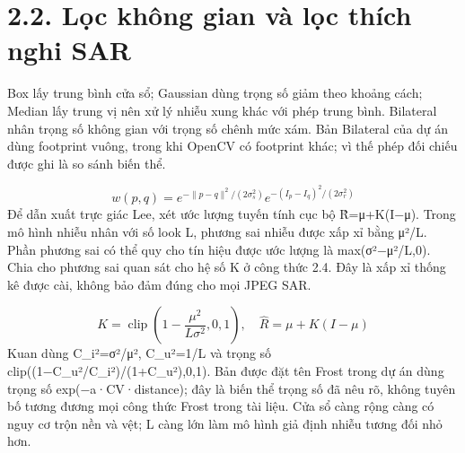 \documentclass[13pt,a4paper]{extreport}
\begin{document}
\section*{2.2. Lọc không gian và lọc thích nghi SAR}
Box lấy trung bình cửa sổ; Gaussian dùng trọng số giảm theo khoảng cách; Median lấy trung vị nên xử lý nhiễu xung khác với phép trung bình. Bilateral nhân trọng số không gian với trọng số chênh mức xám. Bản Bilateral của dự án dùng footprint vuông, trong khi OpenCV có footprint khác; vì thế phép đối chiếu được ghi là so sánh biến thể.
\par
\begin{equation}w(p,q)=e^{-\|p-q\|^2/(2\sigma_s^2)}e^{-(I_p-I_q)^2/(2\sigma_r^2)}\tag{2.3}\end{equation}
Để dẫn xuất trực giác Lee, xét ước lượng tuyến tính cục bộ R̂=μ+K(I−μ). Trong mô hình nhiễu nhân với số look L, phương sai nhiễu được xấp xỉ bằng μ²/L. Phần phương sai có thể quy cho tín hiệu được ước lượng là max(σ²−μ²/L,0). Chia cho phương sai quan sát cho hệ số K ở công thức 2.4. Đây là xấp xỉ thống kê được cài, không bảo đảm đúng cho mọi JPEG SAR.
\par
\begin{equation}K=\operatorname{clip}\left(1-\frac{\mu^2}{L\sigma^2},0,1\right),\quad \hat R=\mu+K(I-\mu)\tag{2.4}\end{equation}
Kuan dùng C\_i²=σ²/μ², C\_u²=1/L và trọng số clip((1−C\_u²/C\_i²)/(1+C\_u²),0,1). Bản được đặt tên Frost trong dự án dùng trọng số exp(−a·CV·distance); đây là biến thể trọng số đã nêu rõ, không tuyên bố tương đương mọi công thức Frost trong tài liệu. Cửa sổ càng rộng càng có nguy cơ trộn nền và vệt; L càng lớn làm mô hình giả định nhiễu tương đối nhỏ hơn.
\par
\clearpage
\end{document}
